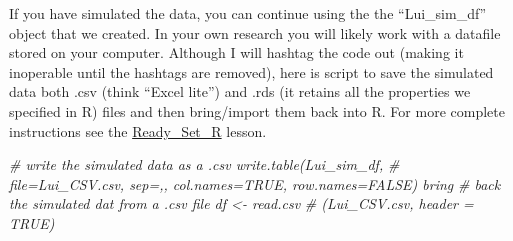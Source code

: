 \documentclass[
  11pt,
]{book}
\newenvironment{Shaded}{\begin{snugshade}}{\end{snugshade}}
\newcommand{\CommentTok}[1]{\textcolor[rgb]{0.37,0.37,0.37}{\textit{#1}}}
\newcommand{\DecValTok}[1]{\textcolor[rgb]{0.06,0.06,0.06}{#1}}
\newcommand{\FunctionTok}[1]{\textcolor[rgb]{0.27,0.27,0.27}{\textbf{#1}}}
\newcommand{\NormalTok}[1]{#1}
\newcommand{\OtherTok}[1]{\textcolor[rgb]{0.37,0.37,0.37}{#1}}
\newcommand{\SpecialCharTok}[1]{\textcolor[rgb]{0.43,0.43,0.43}{\textbf{#1}}}
\newcommand{\StringTok}[1]{\textcolor[rgb]{0.5,0.5,0.5}{#1}}
\begin{document}
\begin{Shaded}
\end{Shaded}

If you have simulated the data, you can continue using the the ``Lui\_sim\_df'' object that we created. In your own research you will likely work with a datafile stored on your computer. Although I will hashtag the code out (making it inoperable until the hashtags are removed), here is script to save the simulated data both .csv (think ``Excel lite'') and .rds (it retains all the properties we specified in R) files and then bring/import them back into R. For more complete instructions see the \protect\hyperlink{Ready}{Ready\_Set\_R} lesson.

\begin{Shaded}
\begin{Highlighting}[]
\CommentTok{\# write the simulated data as a .csv write.table(Lui\_sim\_df,}
\CommentTok{\# file=\textquotesingle{}Lui\_CSV.csv\textquotesingle{}, sep=\textquotesingle{},\textquotesingle{}, col.names=TRUE, row.names=FALSE) bring}
\CommentTok{\# back the simulated dat from a .csv file df \textless{}{-} read.csv}
\CommentTok{\# (\textquotesingle{}Lui\_CSV.csv\textquotesingle{}, header = TRUE)}
\end{Highlighting}
\end{Shaded}
\end{document}
